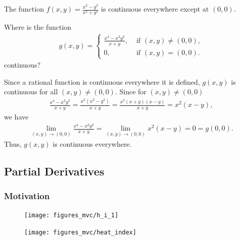 \documentclass[12pt,letterpaper,reqno]{article}
\numberwithin{equation}{section}
\begin{document}
{\begin{example}
The function $f(x,y)=\frac{x^2-y^2}{x^2+y^2}$ is continuous everywhere except at $(0,0)$.	
\end{example}

\begin{exercise}
Where is the function
\begin{align*}
	g(x,y)=\begin{cases}
		\frac{x^4-x^2y^2}{x+y}, &\text{ if } (x,y) \neq (0,0), \\
		0, &\text{ if } (x,y)=(0,0).
	\end{cases}
\end{align*}	
continuous?
\end{exercise}

{\color{red}
\begin{solution}
	Since a rational function is continuous everywhere it is defined, $g(x,y)$ is continuous for all $(x,y) \neq (0,0)$. Since for $(x,y) \neq (0,0)$
	\begin{align*}
		\frac{x^4-x^2y^2}{x+y}=\frac{x^2(x^2-y^2)}{x+y}=\frac{x^2(x+y)(x-y)}{x+y}=x^2(x-y),
	\end{align*}
	we have 
	\begin{align*}
		\lim_{(x,y) \to (0,0)}\frac{x^4-x^2y^2}{x+y}=\lim_{(x,y) \to (0,0)}x^2(x-y)=0=g(0,0).
	\end{align*}
	Thus, $g(x,y)$ is continuous everywhere.
\end{solution}}
\newpage

\subsection{Partial Derivatives}
\subsubsection{Motivation}
\begin{example}\hspace{15cm}
\begin{figure}[h]
	\begin{center}
		\texttt{[image: figures\_mvc/h\_i\_1]}
	\end{center}
\end{figure}
	
\begin{figure}[h]
	\begin{center}
	\texttt{[image: figures\_mvc/heat\_index]}
	\end{center}
\end{figure}


\end{example}}
\end{document}
